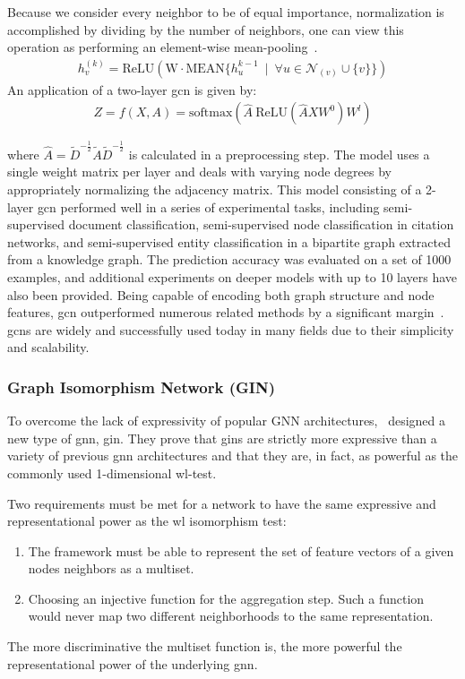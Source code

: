 Because we consider every neighbor to be of equal importance, normalization is accomplished
by dividing by the number of neighbors, one can view this operation as performing an element-wise
mean-pooling~\cite{Xu2019}.
\begin{align*}
    h_{v}^{(k)} = \mathrm{ReLU}(\mathrm{W} \cdot\mathrm{MEAN} \{h_{u}^{k-1}\ \mid \ \forall{u} \in \mathcal{N}_{(v)} \cup \{v\}\})
\end{align*}
An application of a two-layer \ac{gcn} is given by:
\begin{align*}
    Z = f(X,A) = \mathrm{softmax} (\hat{A}\ \mathrm{ReLU}(\hat{A}XW^{0})W^{l})
\end{align*}

where $\hat{A} = \tilde{D}^{-\frac{1}{2}}\tilde{A}\tilde{D}^{-\frac{1}{2}}$ is calculated in a preprocessing step.
The model uses a single weight matrix per layer and deals with varying node degrees by appropriately normalizing the adjacency matrix.
This model consisting of a 2-layer \ac{gcn} performed well in a series of experimental tasks, including semi-supervised document classification, semi-supervised node classification in citation networks, and semi-supervised entity classification in a bipartite graph extracted from a knowledge graph.
The prediction accuracy was evaluated on a set of 1000 examples, and additional experiments on deeper models with up to 10 layers have also been provided. Being capable of encoding both graph structure and node features, \ac{gcn} outperformed numerous related methods by a significant margin~\cite{Kipf2017}.
\Acfp{gcn} are widely and successfully used today in many fields due to their simplicity and scalability.

\subsubsection{Graph Isomorphism Network (GIN)}
\label{sec:related:architectures:gin}
To overcome the lack of expressivity of popular GNN architectures,~\citet{Xu2019} designed a new type of \ac{gnn}, \ac{gin}. They prove that \acp{gin} are strictly more expressive than a variety of previous \ac{gnn} architectures and that they are, in fact, as powerful as the commonly used 1-dimensional \acf{wl}-test.

Two requirements must be met for a network to have the same expressive and representational
power as the \ac{wl} isomorphism test:
\begin{enumerate}
    \item The framework must be able to represent the set of feature vectors of a given nodes
          neighbors as a multiset.
    \item Choosing an injective function for the aggregation step. Such a function would never
          map two different neighborhoods to the same representation.
\end{enumerate}
The more discriminative the multiset function is, the more powerful the representational power of the underlying \ac{gnn}.

